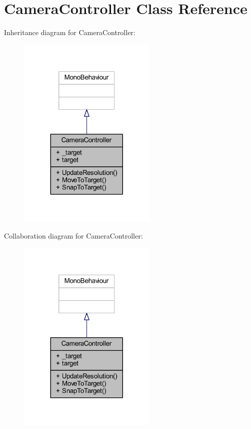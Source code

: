 \hypertarget{class_camera_controller}{}\section{Camera\+Controller Class Reference}
\label{class_camera_controller}


Inheritance diagram for Camera\+Controller\+:
\nopagebreak
\begin{figure}[H]
\begin{center}
\leavevmode
\includegraphics[width=188pt]{class_camera_controller__inherit__graph}
\end{center}
\end{figure}


Collaboration diagram for Camera\+Controller\+:
\nopagebreak
\begin{figure}[H]
\begin{center}
\leavevmode
\includegraphics[width=188pt]{class_camera_controller__coll__graph}
\end{center}
\end{figure}
